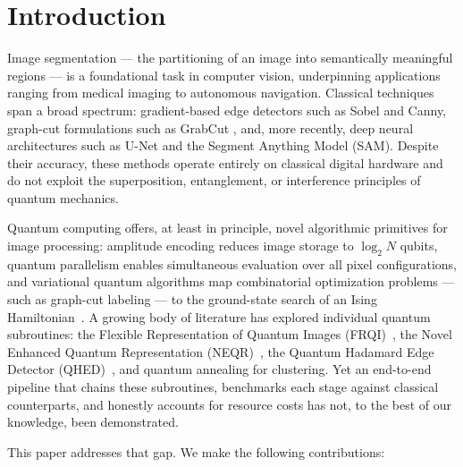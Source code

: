 \documentclass[journal]{IEEEtran}
\begin{document}
\maketitle

\section{Introduction}
\label{sec:intro}

Image segmentation — the partitioning of an image into semantically meaningful
regions — is a foundational task in computer vision, underpinning applications
ranging from medical imaging to autonomous navigation.  Classical techniques
span a broad spectrum: gradient-based edge detectors such as Sobel
\cite{martin2001bsds} and Canny, graph-cut formulations such as GrabCut
\cite{rother2004grabcut}, and, more recently, deep neural architectures such
as U-Net \cite{ronneberger2015unet} and the Segment Anything Model (SAM).
Despite their accuracy, these methods operate entirely on classical digital
hardware and do not exploit the superposition, entanglement, or interference
principles of quantum mechanics.

Quantum computing offers, at least in principle, novel algorithmic primitives
for image processing: amplitude encoding reduces image storage to $\log_2 N$
qubits, quantum parallelism enables simultaneous evaluation over all pixel
configurations, and variational quantum algorithms map combinatorial
optimization problems — such as graph-cut labeling — to the ground-state
search of an Ising Hamiltonian~\cite{lucas2014ising}.  A growing body of
literature has explored individual quantum subroutines: the Flexible
Representation of Quantum Images (FRQI)~\cite{le2011frqi}, the Novel Enhanced
Quantum Representation (NEQR)~\cite{zhang2013neqr}, the Quantum Hadamard Edge
Detector (QHED)~\cite{yao2017qhed}, and quantum annealing for
clustering.  Yet an end-to-end pipeline that chains these subroutines,
benchmarks each stage against classical counterparts, and honestly accounts for
resource costs has not, to the best of our knowledge, been demonstrated.

This paper addresses that gap.  We make the following contributions:
\end{document}
